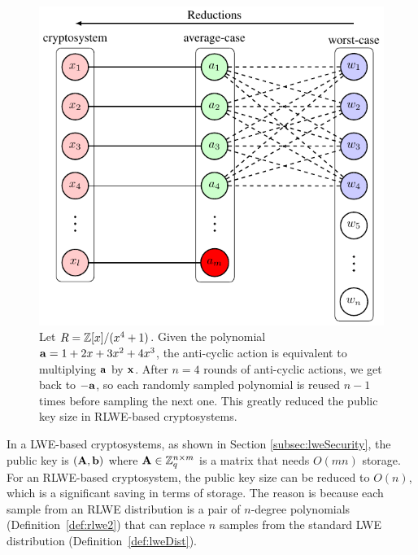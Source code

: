 \documentclass[../main.tex]{subfiles}
\begin{document}
\begin{figure}[ht]
    \centering
    \includegraphics[page=9]{images/Lattice_crypto_tikz_folder.pdf}
    \caption{Let $R=\mathbb{Z}[x]/(x^4+1)$. Given the polynomial $\mathbf{a}=1+2x+3x^2+4x^3$, the anti-cyclic action is equivalent to multiplying $\mathbf{a}$ by $\mathbf{x}$. After $n=4$ rounds of anti-cyclic actions, we get back to $-\mathbf{a}$, so each randomly sampled polynomial is reused $n-1$ times before sampling the next one. This greatly reduced the public key size in RLWE-based cryptosystems.}
    \label{fig:antiCyc}
\end{figure}
\fi

In a LWE-based cryptosystems, as shown in Section \ref{subsec:lweSecurity}, the public key is $(\mathbf{A},\mathbf{b})$ where $\mathbf{A} \in \mathbb{Z}_q^{n \times m}$ is a matrix that needs $O(mn)$ storage. 
For an RLWE-based cryptosystem, the public key size can be reduced to $O(n)$, which is a significant saving in terms of storage. 
The reason is because each sample from an RLWE distribution is a pair of $n$-degree polynomials (Definition~\ref{def:rlwe2}) that can replace $n$ samples from the standard LWE distribution (Definition~\ref{def:lweDist}).

\end{document}
